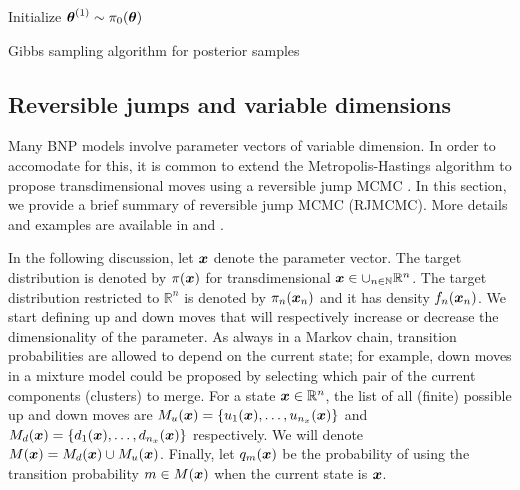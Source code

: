 \begin{algorithm}[H]
\SetAlgoLined
 Initialize $\mbox{\boldmath $\theta$}^{(1)} \sim \pi_0(\mbox{\boldmath $\theta$})$\;
 \caption{Gibbs sampling algorithm for posterior samples}
 \label{algo:gibbs}
 
\end{algorithm}
 

\subsection{Reversible jumps and variable dimensions}

Many BNP models involve parameter vectors of variable dimension. In order to accomodate for this, it is common to extend the Metropolis-Hastings algorithm to propose transdimensional moves using a reversible jump MCMC \citep{green1995}. In this section, we provide a brief summary of reversible jump MCMC (RJMCMC). More details and examples are available in \cite{green1995} and \cite{richardson1997}.

In the following discussion, let $\mbox{\boldmath $x$}$ denote the parameter vector. The target distribution is denoted by $\pi(\mbox{\boldmath $x$})$ for transdimensional $\mbox{\boldmath $x$} \in \cup_{n\in \mathbb{N}}\mathbb{R}^n$. The target distribution restricted to $\mathbb{R}^n$ is denoted by $\pi_n(\mbox{\boldmath $x$}_n)$ and it has density $f_{n}(\mbox{\boldmath $x$}_n)$. We start defining up and down moves that will respectively increase or decrease the dimensionality of the parameter. As always in a Markov chain, transition probabilities are allowed to depend on the current state; for example, down moves in a mixture model could be proposed by selecting which pair of the current components (clusters) to merge. For a state $\mbox{\boldmath $x$}\in \mathbb{R}^{n}$, the list of all (finite) possible up and down moves are $M_u(\mbox{\boldmath $x$}) = \{u_1(\mbox{\boldmath $x$}), \ldots, u_{n_x}(\mbox{\boldmath $x$})\}$ and $M_d(\mbox{\boldmath $x$})=\{ d_1(\mbox{\boldmath $x$}), \ldots , d_{n_x}(\mbox{\boldmath $x$})\}$ respectively. We will denote $M(\mbox{\boldmath $x$})=M_d(\mbox{\boldmath $x$}) \cup M_u(\mbox{\boldmath $x$})$. Finally, let $q_{m}(\mbox{\boldmath $x$})$ be the probability of using the transition probability $m\in M(\mbox{\boldmath $x$})$ when the current state is $\mbox{\boldmath $x$}$.

